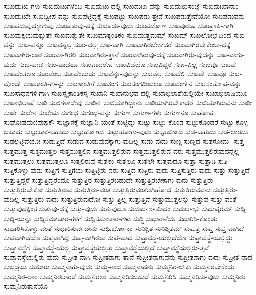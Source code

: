 {ಸುಖದುಃಖ-ಗಳು
ಸುಖದುಃಖಗಳೆಂಬ
ಸುಖದುಃಖ-ದಲ್ಲಿ
ಸುಖದುಃಖ-ವನ್ನು
ಸುಖದುಃಖಸಂಜ್ಞೆ
ಸುಖದುಃಖಾನಾಂ
ಸುಖದುಃಖೇ
ಸುಖದ್ವೀಪ-ವನ್ನು
ಸುಖಪಟ್ಟಿದ್ದಕ್ಕೆ
ಸುಖಪಟ್ಟು
ಸುಖಪಡು-ತ್ತೇನೆ
ಸುಖಪಡುತ್ತೇವೆಯೋ
ಸುಖಪಡುವನು
ಸುಖಪಡುವುದಕ್ಕಾಗುವು
ಸುಖಪಡುವು-ದಕ್ಕೆ
ಸುಖಪಡು-ವುದು
ಸುಖಪಡೋಣ
ಸುಖಪುರುಷ
ಸುಖಪ್ರಾಪ್ತಿ-ಗಾಗಿ
ಸುಖಮಕ್ಷಯಮಶ್ನುತೇ
ಸುಖಮಶ್ನುತೇ
ಸುಖಮಾತ್ಯಂತಿಕಂ
ಸುಖಮುತ್ತಮಮ್
ಸುಖಮ್
ಸುಖಲೋಭ-ದಿಂದ
ಸುಖ-ವನ್ನು
ಸುಖ-ವನ್ನೂ
ಸುಖವನ್ನೆಲ್ಲ
ಸುಖ-ವಲ್ಲ
ಸುಖ-ವಾಗಿ
ಸುಖವಾಗಿರಬೇಕಾದರೆ
ಸುಖವಾಗಿರಬೇಕೆಂಬು-ದಕ್ಕೆ
ಸುಖವಾಗಿರ-ಲಾರ
ಸುಖವಾ-ಗಿರಲಿ
ಸುಖವಾಗಿರು-ತ್ತಾನೆ
ಸುಖವಾಗಿರುವು-ದಕ್ಕೆ
ಸುಖವಾಗಿರು-ವುದನ್ನು
ಸುಖ-ವಾಗು-ವುದು
ಸುಖ-ವಾದ
ಸುಖ-ವಾದರೂ
ಸುಖವಾದರೋ
ಸುಖವಿದೆಯೊ
ಸುಖವಿದ್ದರೆ
ಸುಖ-ವಿಲ್ಲ
ಸುಖವೂ
ಸುಖವೆ
ಸುಖವೆಂತಲೂ
ಸುಖವೆಂಬ
ಸುಖವೆಂಬುದು
ಸುಖವೆನ್ನು-ವುದನ್ನು
ಸುಖವೆಲ್ಲ
ಸುಖವೆಲ್ಲಿ
ಸುಖವೇ
ಸುಖವೊ
ಸುಖ-ವೊಂದೇ
ಸುಖಶಾಂತಿ-ಗಳನ್ನು
ಸುಖಶಾಂತಿಗೆ
ಸುಖಸಂಗ
ಸುಖಸಂಗದಿಂದಲೂ
ಸುಖಸಂಗೇನ
ಸುಖಸಂತೋಷ-ವನ್ನು
ಸುಖಸಾಧನಗಳಿ-ಗಾಗಿ
ಸುಖಸ್ಯೈಕಾಂತಿಕಸ್ಯ
ಸುಖಾನಿ
ಸುಖಾನುಭವ-ದಲ್ಲಿ
ಸುಖಾಭಿಲಾಶೆಯಲ್ಲಿಯೇ
ಸುಖಾಭಿಲಾಷಿಯೂ
ಸುಖಾಭಿಲಾಷೆ
ಸುಖಿ
ಸುಖಿಗಳಾದೇವು
ಸುಖಿನಃ
ಸುಖಿಯಾಗಿದ್ದಾನು
ಸುಖಿಯಾಗಿರಬೇಕಾದರೆ
ಸುಖಿಯಾಗಿರುವನು
ಸುಖೀ
ಸುಖೇ
ಸುಖೇನ
ಸುಖೇಷು
ಸುಗಂಧ
ಸುಗಂಧ-ವನ್ನು
ಸುಗುಣ
ಸುಗುಣ-ಗಳು
ಸುಗುಣನೂ
ಸುಘೋಷ
ಸುಘೋಷಮಣಿಪುಷ್ಪಕೌ
ಸುಜ್ಞಾನಕ್ಕೆ
ಸುಜ್ಞಾನಿ-ಯಂತೆ
ಸುಟ್ಟಿದ್ದು
ಸುಟ್ಟು
ಸುಟ್ಟು-ಕೊಂಡ
ಸುಟ್ಟುಕೊಂಡರೆ
ಸುಟ್ಟು-ಕೊಳ್ಳ-ಬಹುದು
ಸುಟ್ಟುಹಾಕ-ಬಹುದು
ಸುಟ್ಟುಹೋಗಿದೆ
ಸುಟ್ಟುಹೋಗು-ವುದು
ಸುಟ್ಟುಹೋದ
ಸುಡ-ಬಹುದು
ಸುಡ-ಲಾರದು
ಸುಡಲ್ಪಟ್ಟಿವೆಯೋ
ಸುಡುತ್ತಿದೆ
ಸುಡುವ
ಸುಡುವುದಕ್ಕಾಗು-ವುದಿಲ್ಲ
ಸುಡು-ವುದು
ಸುಣ್ಣ
ಸುಣ್ಣದ
ಸುತಸೋಮ
-ಸುತ್ತ
ಸುತ್ತಮುತ್ತ
ಸುತ್ತಮುತ್ತಲ
ಸುತ್ತಮುತ್ತಲಿನ
ಸುತ್ತಮುತ್ತಲಿರುವ
ಸುತ್ತಮುತ್ತಲಿರುವ-ವರು
ಸುತ್ತಮುತ್ತಲಿರುವುದನ್ನೆಲ್ಲ
ಸುತ್ತಮುತ್ತಲು
ಸುತ್ತಮುತ್ತಲೂ
ಸುತ್ತಲಿರುವ
ಸುತ್ತಲು
ಸುತ್ತಲೂ
ಸುತ್ತಲೇ
ಸುತ್ತವುದೂ
ಸುತ್ತಾ
ಸುತ್ತಾಡಿ
ಸುತ್ತಿ
ಸುತ್ತಿಕೊಳ್ಳು-ವುದು
ಸುತ್ತಿಗೆ
ಸುತ್ತಿಗೆಯ
ಸುತ್ತಿಟ್ಟಿರು-ವರು
ಸುತ್ತಿದ
ಸುತ್ತಿರು-ವುದು
ಸುತ್ತಿಸುತ್ತಿರು-ವುದು
ಸುತ್ತು
ಸುತ್ತುತ್ತಿದೆ
ಸುತ್ತುತ್ತಿದ್ದರೆ
ಸುತ್ತುತ್ತಿದ್ದರೆಂದೂ
ಸುತ್ತುತ್ತಿರ
ಸುತ್ತುತ್ತಿರಬಹುದೇ
ಸುತ್ತುತ್ತಿರಬೇಕಾಗು-ವುದು
ಸುತ್ತುತ್ತಿರು
ಸುತ್ತುತ್ತಿರುಬೇಕೋ
ಸುತ್ತುತ್ತಿರುವ
ಸುತ್ತುತ್ತಿರು-ವಂತೆ
ಸುತ್ತುತ್ತಿರುವಂತೆಆಗಿಹೋದ
ಸುತ್ತುತ್ತಿರುವವನು
ಸುತ್ತುತ್ತಿರು-ವುದಿಲ್ಲ
ಸುತ್ತುತ್ತಿರು-ವುದು
ಸುತ್ತುತ್ತಿರುವುದೋ
ಸುತ್ತು-ತ್ತಿಲ್ಲ
ಸುತ್ತುತ್ತಿವೆ
ಸುತ್ತುಮುತ್ತಲನ್ನು
ಸುತ್ತುವ
ಸುತ್ತು-ವಂತೆ
ಸುತ್ತುವುದಕ್ಕಿಂತ
ಸುತ್ತುವು-ದಕ್ಕೆ
ಸುತ್ತು-ವುದು
ಸುತ್ತುವುದೂ
ಸುದುರ್ದರ್ಶಮಿದಂ
ಸುದುರ್ಲಭಃ
ಸುದುಷ್ಕರಮ್
ಸುದ್ದಿ
ಸುದ್ದಿ-ಯನ್ನು
ಸುದ್ದಿಸಮಾಚಾರ-ಗಳಿಗೆ
ಸುದ್ದಿಸಮಾಚಾರ-ಗಳು
ಸುದ್ಧಿ
ಸುಧಾರಣೆಯ
ಸುಧಾರಿಸಿ-ಕೊಂಡು
ಸುಧಾರಿಸಿಕೊಳ್ಳು-ವಂತೆ
ಸುಧಾರಿಸುವು-ದೇನು
ಸುಧೀರ್ಭೋಕ್ತಾ
ಸುನಿಶ್ಚಿತ
ಸುನಿಶ್ಚಿತಮ್
ಸುಪುತ್ರ
ಸುಪ್ತ
ಸುಪ್ತ-ವಾಗಿದೆ
ಸುಪ್ತವಾಗಿದೆಯೊ
ಸುಪ್ತವಾಗಿದ್ದ
ಸುಪ್ತ-ವಾಗಿರುವ
ಸುಪ್ತ-ವಾದ
ಸುಪ್ತಾವಸ್ಥೆ-ಯಲ್ಲಿದೆಯೊ
ಸುಪ್ತಾವಸ್ಥೆ-ಯಲ್ಲಿದ್ದು
ಸುಪ್ತಾವಸ್ಥೆಗೆ
ಸುಪ್ತಾವಸ್ಥೆ-ಯಲ್ಲಿ
ಸುಪ್ತಾವಸ್ಥೆಯಲ್ಲಿತ್ತು
ಸುಪ್ತಾವಸ್ಥೆಯಲ್ಲಿದೆ
ಸುಪ್ತಾವಸ್ಥೆಯಲ್ಲಿರು-ತ್ತವೆ
ಸುಪ್ತಾವಸ್ಥೆಯಲ್ಲಿರು-ವುದು
ಸುಪ್ರೀತ-ನಾಗಿ
ಸುಪ್ರೀತನಾಗು-ತ್ತಾನೆ
ಸುಪ್ರೀತನಾಗುವನು
ಸುಪ್ರೀತನಾಗು-ವುದು
ಸುಪ್ರೀತ-ನಾದ
ಸುಭದ್ರೆಯ
ಸುಮಾರು
ಸುಮ್ಮನಾಗು-ವುದು
ಸುಮ್ಮ-ನಾದ
ಸುಮ್ಮನಾದನು
ಸುಮ್ಮನಿರ-ಬೇಕು
ಸುಮ್ಮನಿರಬೇಕೆಂದು
ಸುಮ್ಮನಿರ-ಲಾರ
ಸುಮ್ಮನಿರಲಾರದೆ
ಸುಮ್ಮನಿರಲು
ಸುಮ್ಮನಿರಿಸಬಹುದೆ
ಸುಮ್ಮನಿರಿಸಿ
ಸುಮ್ಮನಿರಿಸು-ವುದು
ಸುಮ್ಮನಿರು
ಸುಮ್ಮನಿರುತ್ತಾನೆಯೊ
}
